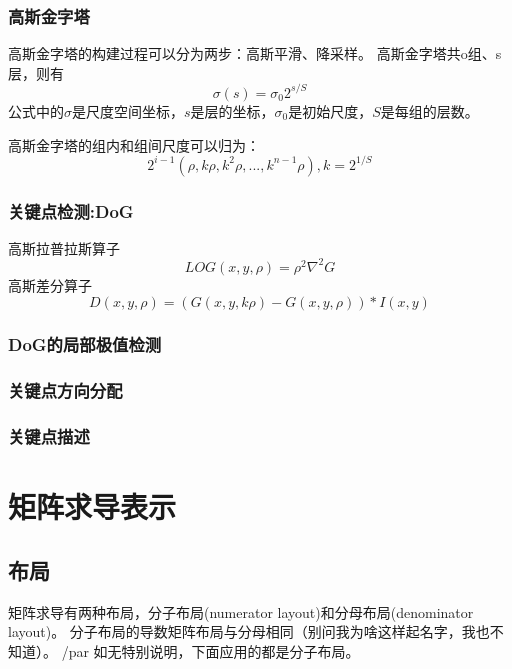 \documentclass{ctexart}
\begin{document}
{	\subsubsection{高斯金字塔}
	高斯金字塔的构建过程可以分为两步：高斯平滑、降采样。
	高斯金字塔共o组、s层，则有
	\begin{equation}
	\sigma(s)=\sigma_0 2^{s/S}
	\end{equation}
	公式中的$\sigma$是尺度空间坐标，$s$是层的坐标，$\sigma_0$是初始尺度，$S$是每组的层数。
	\par 高斯金字塔的组内和组间尺度可以归为：
	\begin{equation}
	2^{i-1} (\rho,k\rho,k^2\rho,...,k^{n-1}\rho),
	k=2^{1/S}
	\end{equation}
	\subsubsection{关键点检测:DoG}
	高斯拉普拉斯算子
	\begin{equation}
	LOG(x,y,\rho)=\rho^2 \nabla^2 G
	\end{equation}
	高斯差分算子
	\begin{equation}
	D(x,y,\rho)=\left(G(x,y,k\rho)-G(x,y,\rho)\right)*I(x,y)
	\end{equation}
	\subsubsection{DoG的局部极值检测}
	
	\subsubsection{关键点方向分配}
	
	\subsubsection{关键点描述}
	
	
	
	\section{矩阵求导表示}
	\subsection{布局}
	矩阵求导有两种布局，分子布局(numerator layout)和分母布局(denominator layout)。
	分子布局的导数矩阵布局与分母相同（别问我为啥这样起名字，我也不知道）。
	/par 如无特别说明，下面应用的都是分子布局。	
}
\end{document}
